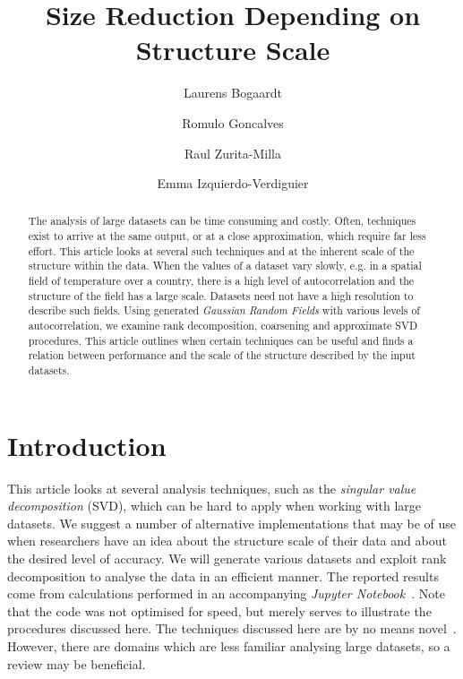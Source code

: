 \documentclass[sigconf]{acmart}
\begin{document}
\title{Size Reduction Depending on Structure Scale}

\author{Laurens Bogaardt}

\author{Romulo Goncalves}

\author{Raul Zurita-Milla}

\author{Emma Izquierdo-Verdiguier}

\begin{abstract}
The analysis of large datasets can be time consuming and costly. Often, techniques exist to arrive at the same output, or at a close approximation, which require far less effort. This article looks at several such techniques and at the inherent scale of the structure within the data. When the values of a dataset vary slowly, e.g. in a spatial field of temperature over a country, there is a high level of autocorrelation and the structure of the field has a large scale. Datasets need not have a high resolution to describe such fields. Using generated \textit{Gaussian Random Fields} with various levels of autocorrelation, we examine rank decomposition, coarsening and approximate SVD procedures. This article outlines when certain techniques can be useful and finds a relation between performance and the scale of the structure described by the input datasets.
\end{abstract}


\maketitle

\section{Introduction}
\label{sec:Introduction}

This article looks at several analysis techniques, such as the \textit{singular value decomposition} (SVD), which can be hard to apply when working with large datasets. We suggest a number of alternative implementations that may be of use when researchers have an idea about the structure scale of their data and about the desired level of accuracy. We will generate various datasets and exploit rank decomposition to analyse the data in an efficient manner. The reported results come from calculations performed in an accompanying \textit{Jupyter Notebook}~\cite{Bogaardt2018}. Note that the code was not optimised for speed, but merely serves to illustrate the procedures discussed here. The techniques discussed here are by no means novel~\cite{Golub1970, Bjorck1973, Chan1982}. However, there are domains which are less familiar analysing large datasets, so a review may be beneficial.
\end{document}
